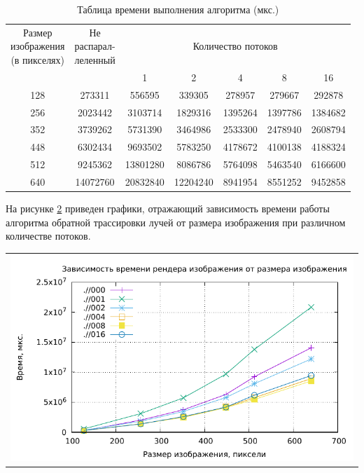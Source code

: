 \begin{table}[H]
	\begin{center}
		\caption{\label{tbl:profilingalgs1} Таблица времени выполнения алгоритма (мкс.)}
		\begin{tabular}{|c|c|c|c|c|c|c|}
			\hline
			\specialcell{Размер\\изображения\\(в пикселях)} &  \specialcell{Не\\ распарал-\\леленный}    & \multicolumn{5}{|c|}{Количество потоков}\\
			\cline{3-7}
			&   &1&2& 4&8&16\\ 
			
			\hline
			128 & 273311 & 556595 & 339305 & 278957 & 279667 & 292878 \\ \hline
			256 & 2023442 & 3103714 & 1829316 & 1395264 & 1397786 & 1384682 \\ \hline
			352 & 3739262 & 5731390 & 3464986 & 2533300 & 2478940 & 2608794 \\ \hline
			448 & 6302434 & 9693502 & 5783250 & 4178672 & 4100138 & 4188324 \\ \hline
			512 & 9245362 & 13801280 & 8086786 & 5764098 & 5463540 & 6166600 \\ \hline
			640 & 14072760 & 20832840 & 12204240 & 8941954 & 8551252 & 9452858 \\ \hline
			
			
			
		\end{tabular}
	\end{center}
\end{table}

На рисунке \ref{img:plot} приведен графики, отражающий зависимость
времени работы алгоритма обратной трассировки лучей от размера изображения при различном количестве потоков.

\begin{table}[H]
	\centering
	\begin{tabular}{p{1\linewidth}}
		\centering
		\includegraphics[width=0.81\linewidth]{include/plot.pdf}
		\captionof{figure}{Зависимость
			времени работы алгоритма обратной трассировки лучей от размера изображения при различном количестве потоков}
		\label{img:plot}
	\end{tabular}
\end{table}

